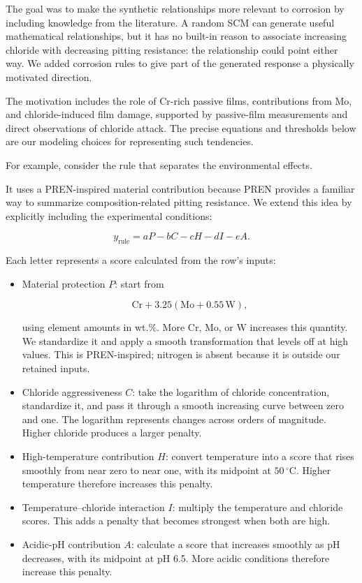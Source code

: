 \documentclass[11pt]{article}
\newenvironment{notes}
  {\begin{itemize}\setlength{\itemsep}{0.45em}\setlength{\parsep}{0pt}}
  {\end{itemize}}
\begin{document}
The goal was to make the synthetic relationships more relevant to corrosion by including
knowledge from the literature. A random SCM can generate useful mathematical relationships,
but it has no built-in reason to associate increasing chloride with decreasing pitting
resistance: the relationship could point either way. We added corrosion rules to give part
of the generated response a physically motivated direction.

The motivation includes the role of Cr-rich passive films, contributions from Mo, and
chloride-induced film damage, supported by passive-film measurements and direct observations
of chloride attack. The precise equations and thresholds below are our modeling choices for
representing such tendencies.

For example, consider the rule that separates the environmental effects.

It uses a PREN-inspired material contribution because PREN provides a familiar way to
summarize composition-related pitting resistance. We extend this idea by explicitly
including the experimental conditions:

    \[
    y_{\mathrm{rule}} = aP-bC-cH-dI-eA.
    \]

Each letter represents a score calculated from the row’s inputs:

\begin{notes}

    \item Material protection \(P\): start from

    \[
    \mathrm{Cr}+3.25(\mathrm{Mo}+0.55\,\mathrm{W}),
    \]

using element amounts in wt.\%. More Cr, Mo, or W increases this quantity. We standardize it
and apply a smooth transformation that levels off at high values. This is PREN-inspired;
nitrogen is absent because it is outside our retained inputs.

    \item Chloride aggressiveness \(C\): take the logarithm of chloride concentration,
    standardize it, and pass it through a smooth increasing curve between zero and one. The
    logarithm represents changes across orders of magnitude. Higher chloride produces a
    larger penalty.

    \item High-temperature contribution \(H\): convert temperature into a score that rises
    smoothly from near zero to near one, with its midpoint at \(50\,^\circ\mathrm{C}\).
    Higher temperature therefore increases this penalty.

    \item Temperature–chloride interaction \(I\): multiply the temperature and chloride
    scores. This adds a penalty that becomes strongest when both are high.

    \item Acidic-pH contribution \(A\): calculate a score that increases smoothly as pH
    decreases, with its midpoint at pH 6.5. More acidic conditions therefore increase this
    penalty.

\end{notes}
\end{document}
